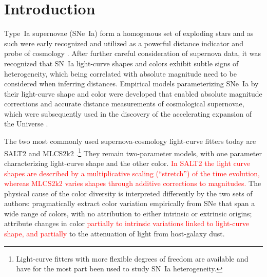 \documentclass{aastex61}   	%
\begin{document}
\section{Introduction}
Type~Ia supernovae (SNe~Ia) form a homogenous set of exploding stars and as such were early recognized and utilized as a powerful distance indicator 
and probe of cosmology \citep[e.g.][]{1992ARA&A..30..359B, 1993ApJ...415....1S}.  After further careful consideration of supernova data, it was recognized
that SN~Ia light-curve shapes \citep{1993ApJ...413L.105P} and colors \citep{1996ApJ...473...88R, 1998A&A...331..815T} exhibit subtle signs of heterogeneity,
which being correlated with absolute magnitude
need to be considered when inferring distances.  Empirical models parameterizing SNe~Ia by their light-curve shape \citep{1996ApJ...473...88R,
1997ApJ...483..565P,
1999ApJ...517..565P}
and color  \citep{1996ApJ...473...88R}  were developed that enabled absolute magnitude corrections
and accurate distance measurements of cosmological supernovae,
which 
were subsequently used in the discovery of the accelerating expansion of the Universe \citep{1998AJ....116.1009R,1999ApJ...517..565P}.

The two most commonly used supernova-cosmology light-curve fitters today are SALT2 \citep{2007A&A...466...11G} and MLCS2k2
\citep{2007ApJ...659..122J}.\footnote{Light-curve fitters with more flexible degrees of freedom
\citep[e.g.][]{2008ApJ...681..482C, 2011AJ....141...19B, 2011ApJ...731..120M} are available and have for
the most part been used to study SN~Ia heterogeneity.}
They remain two-parameter models, with one parameter characterizing light-curve shape and the other
 color.
 \textcolor{red}{In SALT2 the light curve shapes are described by a multiplicative scaling (``stretch'')  of the time evolution,
 whereas MLCS2k2 varies shapes through additive corrections to magnitudes.}
 The physical cause of the color diversity is interpreted differently by the two sets of authors: 
\citet{2007A&A...466...11G} pragmatically extract color variation empirically from SNe that span a wide range of colors, with no attribution
to either intrinsic or extrinsic origins;
\citet{2007ApJ...659..122J}
attribute changes in color
\textcolor{red}{partially to intrinsic variations linked to light-curve shape, and partially}
to the attenuation of light from host-galaxy dust.
\end{document}
